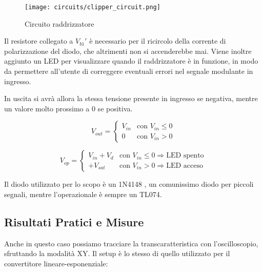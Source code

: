 \begin{figure}[H]
    \centering
    \texttt{[image: circuits/clipper\_circuit.png]}
    \caption{Circuito raddrizzatore}
    \label{clipper_circuit}
\end{figure}

Il resistore collegato a $V_{b1}'$ è necessario per il ricircolo della corrente di
polarizzazione del diodo, che altrimenti non si accenderebbe mai. Viene inoltre aggiunto un
LED per visualizzare quando il raddrizzatore è in funzione, in modo da permettere all'utente
di correggere eventuali errori nel segnale modulante in ingresso.

In uscita si avrà allora la stessa tensione presente in ingresso se negativa, mentre un valore
molto prossimo a $0$ se positiva.

\begin{equation}\label{clipper_out}
    V_{out} =
    \left\{
    \begin{array}{lr}
        V_{in} & \text{con } V_{in}\le0 \\
        0      & \text{con } V_{in}>0
    \end{array}
    \right.
\end{equation}

\begin{equation}\label{clipper_op}
    V_{op} =
    \left\{
    \begin{array}{lr}
        V_{in}+V_d & \text{con } V_{in}\le0\Rightarrow \text{LED spento} \\
        +V_{sat}   & \text{con } V_{in}>0\Rightarrow \text{LED acceso}
    \end{array}
    \right.
\end{equation}

Il diodo utilizzato per lo scopo è un 1N4148 \cite{1n4148}, un comunissimo diodo per piccoli
segnali, mentre l'operazionale è sempre un TL074.


\subsection*{Risultati Pratici e Misure}


Anche in questo caso possiamo tracciare la transcaratteristica con l'oscilloscopio, sfruttando
la modalità XY. Il setup è lo stesso di quello utilizzato per il convertitore
lineare-esponenziale:

